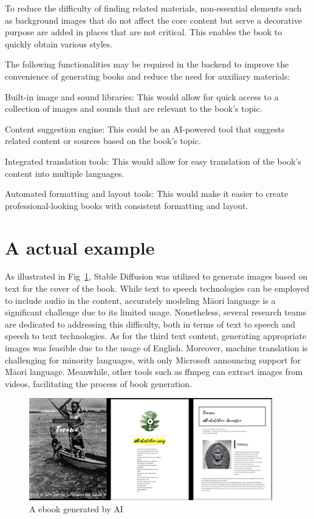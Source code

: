 To reduce the difficulty of finding related materials, non-essential elements such as background images that do not affect the core content but serve a decorative purpose are added in places that are not critical. This enables the book to quickly obtain various styles.

The following functionalities may be required in the backend to improve the convenience of generating books and reduce the need for auxiliary materials:

Built-in image and sound libraries: This would allow for quick access to a collection of images and sounds that are relevant to the book's topic.

Content suggestion engine: This could be an AI-powered tool that suggests related content or sources based on the book's topic.

Integrated translation tools: This would allow for easy translation of the book's content into multiple languages.

Automated formatting and layout tools: This would make it easier to create professional-looking books with consistent formatting and layout.

\section{A actual example}

As illustrated in Fig~\ref{s-3}, Stable Diffusion\autocite{StableDi96:online} was utilized to generate images based on text for the cover of the book. 
While text to speech technologies can be employed to include audio in the content, accurately modeling Māori language is a significant challenge due to its limited usage. 
Nonetheless, several research teams\autocite{PapaReo84:online} \autocite{KaituhiA38:online} are dedicated to addressing this difficulty, both in terms of text to speech and speech to text technologies. 
As for the third text content, generating appropriate images was feasible due to the usage of English. 
Moreover, machine translation is challenging for minority languages, with only Microsoft announcing support for Māori language\autocite{Kiaorate17:online}. 
Meanwhile, other tools such as ffmpeg can extract images from videos, facilitating the process of book generation.

\begin{figure}[htbp]
  \centerline{\includegraphics[width=300pt]{images/s-3.jpg}}
  \caption{A ebook generated by AI}
  \label{s-3}
\end{figure}

